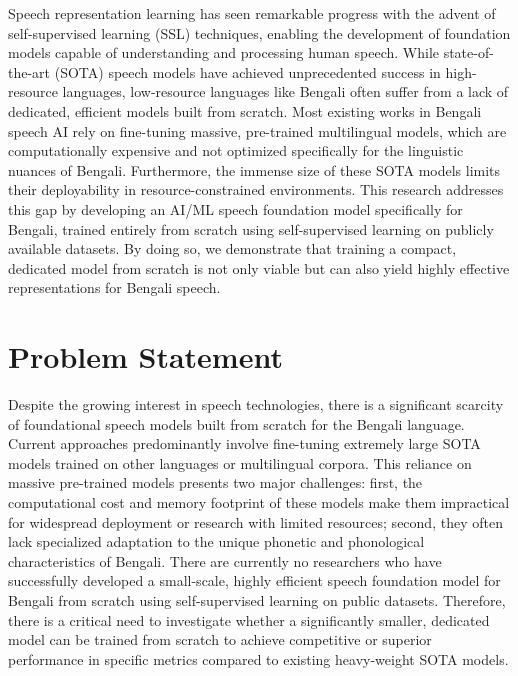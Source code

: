 Speech representation learning has seen remarkable progress with the advent of self-supervised learning (SSL) techniques, enabling the development of foundation models capable of understanding and processing human speech. While state-of-the-art (SOTA) speech models have achieved unprecedented success in high-resource languages, low-resource languages like Bengali often suffer from a lack of dedicated, efficient models built from scratch. Most existing works in Bengali speech AI rely on fine-tuning massive, pre-trained multilingual models, which are computationally expensive and not optimized specifically for the linguistic nuances of Bengali. Furthermore, the immense size of these SOTA models limits their deployability in resource-constrained environments. This research addresses this gap by developing an AI/ML speech foundation model specifically for Bengali, trained entirely from scratch using self-supervised learning on publicly available datasets. By doing so, we demonstrate that training a compact, dedicated model from scratch is not only viable but can also yield highly effective representations for Bengali speech.

\section{Problem Statement}
Despite the growing interest in speech technologies, there is a significant scarcity of foundational speech models built from scratch for the Bengali language. Current approaches predominantly involve fine-tuning extremely large SOTA models trained on other languages or multilingual corpora. This reliance on massive pre-trained models presents two major challenges: first, the computational cost and memory footprint of these models make them impractical for widespread deployment or research with limited resources; second, they often lack specialized adaptation to the unique phonetic and phonological characteristics of Bengali. There are currently no researchers who have successfully developed a small-scale, highly efficient speech foundation model for Bengali from scratch using self-supervised learning on public datasets. Therefore, there is a critical need to investigate whether a significantly smaller, dedicated model can be trained from scratch to achieve competitive or superior performance in specific metrics compared to existing heavy-weight SOTA models.

